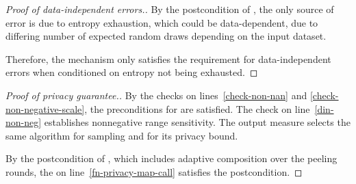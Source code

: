 \documentclass{article}
\begin{document}
\begin{proof}[Proof of data-independent errors.]
    By the postcondition of ,
    the only source of error is due to entropy exhaustion, which could be data-dependent,
    due to differing number of expected random draws depending on the input dataset.

    Therefore, the mechanism only satisfies the requirement for data-independent errors when conditioned on entropy not being exhausted.
\end{proof}

\begin{proof}[Proof of privacy guarantee.]
    By the checks on lines~\ref{check-non-nan} and \ref{check-non-negative-scale},
    the preconditions for  are satisfied.
    The check on line~\ref{din-non-neg} establishes nonnegative range sensitivity.
    The output measure selects the same algorithm for sampling and for its privacy bound.

    By the postcondition of , which includes adaptive composition over the peeling rounds,
    the \dout on line~\ref{fn-privacy-map-call} satisfies the postcondition.
\end{proof}
\end{document}
